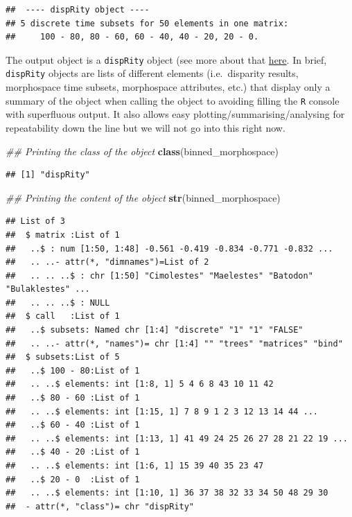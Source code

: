 \documentclass[]{book}
\newenvironment{Shaded}{\begin{snugshade}}{\end{snugshade}}
\newcommand{\CommentTok}[1]{\textcolor[rgb]{0.56,0.35,0.01}{\textit{#1}}}
\newcommand{\KeywordTok}[1]{\textcolor[rgb]{0.13,0.29,0.53}{\textbf{#1}}}
\newcommand{\NormalTok}[1]{#1}
\begin{document}
\begin{verbatim}
##  ---- dispRity object ---- 
## 5 discrete time subsets for 50 elements in one matrix:
##     100 - 80, 80 - 60, 60 - 40, 40 - 20, 20 - 0.
\end{verbatim}

The output object is a \texttt{dispRity} object (see more about that \protect\hyperlink{The-guts-of-the-dispRity-package}{here}.
In brief, \texttt{dispRity} objects are lists of different elements (i.e.~disparity results, morphospace time subsets, morphospace attributes, etc.) that display only a summary of the object when calling the object to avoiding filling the \texttt{R} console with superfluous output.
It also allows easy plotting/summarising/analysing for repeatability down the line but we will not go into this right now.

\begin{Shaded}
\begin{Highlighting}[]
\CommentTok{## Printing the class of the object}
\KeywordTok{class}\NormalTok{(binned_morphospace)}
\end{Highlighting}
\end{Shaded}

\begin{verbatim}
## [1] "dispRity"
\end{verbatim}

\begin{Shaded}
\begin{Highlighting}[]
\CommentTok{## Printing the content of the object}
\KeywordTok{str}\NormalTok{(binned_morphospace)}
\end{Highlighting}
\end{Shaded}

\begin{verbatim}
## List of 3
##  $ matrix :List of 1
##   ..$ : num [1:50, 1:48] -0.561 -0.419 -0.834 -0.771 -0.832 ...
##   .. ..- attr(*, "dimnames")=List of 2
##   .. .. ..$ : chr [1:50] "Cimolestes" "Maelestes" "Batodon" "Bulaklestes" ...
##   .. .. ..$ : NULL
##  $ call   :List of 1
##   ..$ subsets: Named chr [1:4] "discrete" "1" "1" "FALSE"
##   .. ..- attr(*, "names")= chr [1:4] "" "trees" "matrices" "bind"
##  $ subsets:List of 5
##   ..$ 100 - 80:List of 1
##   .. ..$ elements: int [1:8, 1] 5 4 6 8 43 10 11 42
##   ..$ 80 - 60 :List of 1
##   .. ..$ elements: int [1:15, 1] 7 8 9 1 2 3 12 13 14 44 ...
##   ..$ 60 - 40 :List of 1
##   .. ..$ elements: int [1:13, 1] 41 49 24 25 26 27 28 21 22 19 ...
##   ..$ 40 - 20 :List of 1
##   .. ..$ elements: int [1:6, 1] 15 39 40 35 23 47
##   ..$ 20 - 0  :List of 1
##   .. ..$ elements: int [1:10, 1] 36 37 38 32 33 34 50 48 29 30
##  - attr(*, "class")= chr "dispRity"
\end{verbatim}
\end{document}
